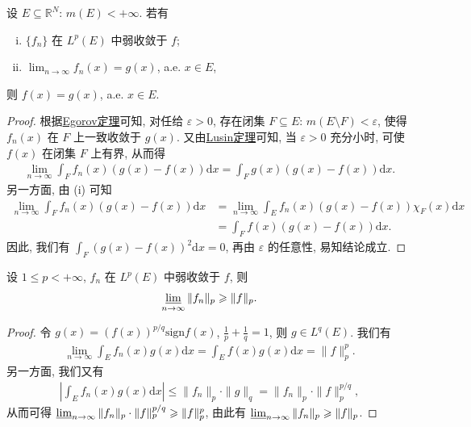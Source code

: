 \documentclass[../../main.tex]{subfiles}%
\begin{document}
\begin{theorem}
设 $E\subseteq\mathbb{R}^N$: $m(E)<+\infty$. 若有
\begin{enumerate}[(i)]
\item $\{f_n\}$ 在 $L^p(E)$ 中弱收敛于 $f$;
\item $\lim_{n\to\infty}f_n(x)=g(x)$, a.e. $x\in E$,
\end{enumerate}
则 $f(x)=g(x)$, a.e. $x\in E$.
\end{theorem}

\begin{proof}
根据\hyperref[theorem:Egorov定理]{Egorov定理}可知, 对任给 $\varepsilon>0$, 存在闭集 $F\subseteq E$: $m(E\setminus F)<\varepsilon$, 使得 $f_n(x)$ 在 $F$ 上一致收敛于 $g(x)$. 又由\hyperref[theorem:Lusin(卢津)定理]{Lusin定理}可知, 当 $\varepsilon>0$ 充分小时, 可使 $f(x)$ 在闭集 $F$ 上有界, 从而得
\begin{align*}
\lim_{n\to\infty}\int_F f_n(x)(g(x)-f(x))\mathrm{d}x=\int_F g(x)(g(x)-f(x))\mathrm{d}x.
\end{align*}
另一方面, 由 (i) 可知
\begin{align*}
\lim_{n\to\infty}\int_F f_n(x)(g(x)-f(x))\mathrm{d}x
&=\lim_{n\to\infty}\int_E f_n(x)(g(x)-f(x))\chi_F(x)\mathrm{d}x \\
&=\int_F f(x)(g(x)-f(x))\mathrm{d}x.
\end{align*}
因此, 我们有 $\int_F (g(x)-f(x))^2\mathrm{d}x=0$, 再由 $\varepsilon$ 的任意性, 易知结论成立.
\end{proof}

\begin{theorem}
设 $1\leqslant p<+\infty$, $f_n$ 在 $L^p(E)$ 中弱收敛于 $f$, 则
\begin{align*}
\varliminf_{n\to\infty}\|f_n\|_p\geqslant\|f\|_p.
\end{align*}
\end{theorem}
\begin{proof}
令 $g(x)=(f(x))^{p/q}\mathrm{sign}f(x)$, $\frac{1}{p}+\frac{1}{q}=1$, 则 $g\in L^q(E)$. 我们有
\begin{align*}
\lim_{n\to\infty}\int_E f_n(x)g(x)\mathrm{d}x=\int_E f(x)g(x)\mathrm{d}x=\|f\|_p^p.
\end{align*}
另一方面, 我们又有
\begin{align*}
\left|\int_E f_n(x)g(x)\mathrm{d}x\right|\leqslant\|f_n\|_p\cdot\|g\|_q=\|f_n\|_p\cdot\|f\|_p^{p/q},
\end{align*}
从而可得 $\varliminf_{n\to\infty}\|f_n\|_p\cdot\|f\|_p^{p/q}\geqslant\|f\|_p^p$, 由此有 $\varliminf_{n\to\infty}\|f_n\|_p\geqslant\|f\|_p$.
\end{proof}
\end{document}

